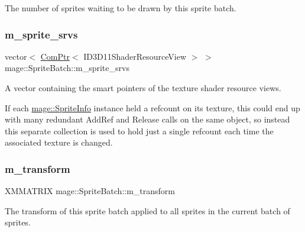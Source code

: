 The number of sprites waiting to be drawn by this sprite batch. \hypertarget{classmage_1_1_sprite_batch_adaad3bca737877db16bfa781563d8a93}{}\label{classmage_1_1_sprite_batch_adaad3bca737877db16bfa781563d8a93} 
\subsubsection{\texorpdfstring{m\+\_\+sprite\+\_\+srvs}{m\_sprite\_srvs}}
{\footnotesize\ttfamily vector$<$ \hyperlink{namespacemage_ae74f374780900893caa5555d1031fd79}{Com\+Ptr}$<$ I\+D3\+D11\+Shader\+Resource\+View $>$ $>$ mage\+::\+Sprite\+Batch\+::m\+\_\+sprite\+\_\+srvs\hspace{0.3cm}{\ttfamily [private]}}

A vector containing the smart pointers of the texture shader resource views.

If each \hyperlink{structmage_1_1_sprite_info}{mage\+::\+Sprite\+Info} instance held a refcount on its texture, this could end up with many redundant {\ttfamily Add\+Ref} and {\ttfamily Release} calls on the same object, so instead this separate collection is used to hold just a single refcount each time the associated texture is changed. \hypertarget{classmage_1_1_sprite_batch_ad8a12f1f6c8289548346d469c9436c58}{}\label{classmage_1_1_sprite_batch_ad8a12f1f6c8289548346d469c9436c58} 
\subsubsection{\texorpdfstring{m\+\_\+transform}{m\_transform}}
{\footnotesize\ttfamily X\+M\+M\+A\+T\+R\+IX mage\+::\+Sprite\+Batch\+::m\+\_\+transform\hspace{0.3cm}{\ttfamily [private]}}

The transform of this sprite batch applied to all sprites in the current batch of sprites. \hypertarget{classmage_1_1_sprite_batch_ac8ff5a2d9956b4a33cb1f41310abf129}{}\label{classmage_1_1_sprite_batch_ac8ff5a2d9956b4a33cb1f41310abf129} 
